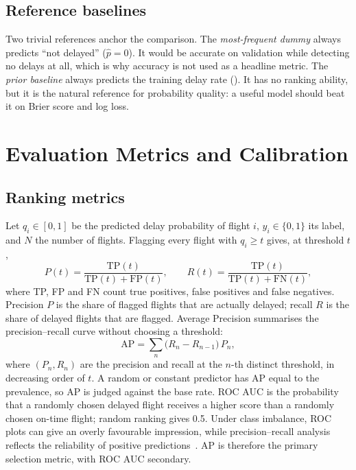 \documentclass[conference]{IEEEtran}
\begin{document}
\subsection{Reference baselines}
Two trivial references anchor the comparison. The \emph{most-frequent dummy} always predicts ``not
delayed'' ($\hat{p}=0$). It would be \DummyAccuracy{} accurate on validation while detecting no
delays at all, which is why accuracy is not used as a headline metric. The \emph{prior baseline}
always predicts the training delay rate (\TrainPrev{}). It has no ranking ability, but it is the
natural reference for probability quality: a useful model should beat it on Brier score and log
loss.

\section{Evaluation Metrics and Calibration}\label{sec:calibration}
\subsection{Ranking metrics}
Let $q_i\in[0,1]$ be the predicted delay probability of flight $i$, $y_i\in\{0,1\}$ its label, and
$N$ the number of flights. Flagging every flight with $q_i\geq t$ gives, at threshold $t$,
\begin{equation}
P(t) = \frac{\mathrm{TP}(t)}{\mathrm{TP}(t)+\mathrm{FP}(t)},\qquad
R(t) = \frac{\mathrm{TP}(t)}{\mathrm{TP}(t)+\mathrm{FN}(t)},
\end{equation}
where TP, FP and FN count true positives, false positives and false negatives. Precision $P$ is the
share of flagged flights that are actually delayed; recall $R$ is the share of delayed flights that
are flagged. Average Precision summarises the precision--recall curve without choosing a threshold:
\begin{equation}
\mathrm{AP}=\sum_{n}\big(R_n-R_{n-1}\big)\,P_n ,
\end{equation}
where $(P_n, R_n)$ are the precision and recall at the $n$-th distinct threshold, in decreasing
order of $t$. A random or constant predictor has AP equal to the prevalence, so AP is judged
against the base rate. ROC AUC is the probability that a randomly chosen delayed flight receives a
higher score than a randomly chosen on-time flight; random ranking gives 0.5. Under class imbalance,
ROC plots can give an overly favourable impression, while precision--recall analysis reflects the
reliability of positive predictions~\cite{saito2015,davis2006}. AP is therefore the primary
selection metric, with ROC AUC secondary.
\end{document}
